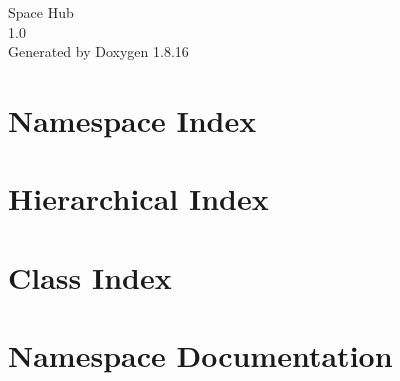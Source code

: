 \let\mypdfximage\pdfximage\def\pdfximage{\immediate\mypdfximage}\documentclass[twoside]{book}
\newcommand{\+}{\discretionary{\mbox{\scriptsize$\hookleftarrow$}}{}{}}
\newcommand{\clearemptydoublepage}{%
  \newpage{\pagestyle{empty}\cleardoublepage}%
}
\begin{document}
\hypersetup{pageanchor=false,
             bookmarksnumbered=true,
             pdfencoding=unicode
            }
\begin{titlepage}
\vspace*{7cm}
\begin{center}%
{\Large Space Hub \\[1ex]\large 1.\+0 }\\
\vspace*{1cm}
{\large Generated by Doxygen 1.8.16}\\
\end{center}
\end{titlepage}
\clearemptydoublepage
{}
\tableofcontents
\clearemptydoublepage
{}
\hypersetup{pageanchor=true}

\chapter{Namespace Index}

\chapter{Hierarchical Index}

\chapter{Class Index}

\chapter{Namespace Documentation}











\end{document}
